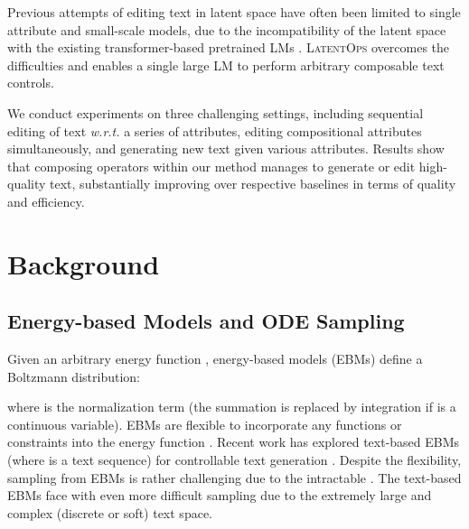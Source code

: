 \documentclass[11pt]{article}
\begin{document}
Previous attempts of editing text in latent space have often been limited to single attribute and small-scale models, due to the incompatibility of the latent space with the existing transformer-based pretrained LMs \cite{DBLP:conf/nips/WangH019,DBLP:conf/aaai/LiuFZPL20, DBLP:conf/icml/ShenMBJ20,DBLP:conf/acl/DuanXPHL20,DBLP:conf/emnlp/MaiPMSH20}. \textsc{LatentOps} overcomes the difficulties and enables a single large LM to perform arbitrary composable text controls.

We conduct experiments on three challenging settings, including sequential editing of text \emph{w.r.t.} a series of attributes, editing compositional attributes simultaneously, and generating new text given various attributes. Results show that composing operators within our method manages to generate or edit high-quality text, substantially improving over respective baselines in terms of quality and efficiency.

















 \label{sec:intro}

\section{Background}


\subsection{Energy-based Models and ODE Sampling}
\label{sec:bg_ebms}
Given an arbitrary energy function , energy-based models (EBMs) define a Boltzmann distribution:

where  is the normalization term (the summation is replaced by integration if  is a continuous variable). 
EBMs are flexible to incorporate any functions or constraints into the energy function . Recent work has explored text-based EBMs (where  is a text sequence) for controllable text generation \cite{DBLP:conf/nips/HuYSQLDX18,DBLP:conf/iclr/DengBOSR20,DBLP:journals/corr/abs-2106-15078,DBLP:conf/iclr/KhalifaED21,DBLP:journals/corr/abs-2203-13299,QinCOLD}.
Despite the flexibility, sampling from EBMs is rather challenging due to the intractable . The text-based EBMs
face with even more difficult sampling due to the extremely large and complex (discrete or soft) text space.
\end{document}
